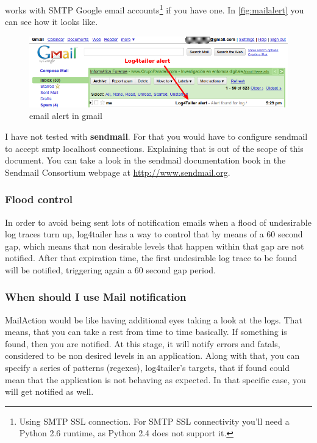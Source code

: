 \logftailer{} works with SMTP Google email accounts\footnote{Using SMTP SSL
connection. For SMTP SSL connectivity you'll need a Python 2.6 runtime, as
Python 2.4 does not support it.} if you have one.  In \autoref{fig:mailalert}
you can see how it looks like.

\begin{figure}[hb]
\includegraphics[scale=0.55]{emailalert.png}
\caption{\logftailer{} email alert in gmail}\label{fig:mailalert}
\end{figure}

I have not tested \logftailer{} with \textbf{sendmail}. For that you would have
to configure sendmail to accept smtp localhost connections.  Explaining that is
out of the scope of this document. You can take a look in the sendmail
documentation book in the Sendmail Consortium webpage at
\href{http://www.sendmail.org}{http://www.sendmail.org}.

\subsubsection{Flood control}
In order to avoid being sent lots of notification emails when a flood of
undesirable log traces turn up, log4tailer has a way to control that by means
of a 60 second gap, which means that non desirable levels that happen within
that gap are not notified. After that expiration time, the first undesirable
log trace to be found will be notified, triggering again a 60 second gap
period. 
 
\subsubsection{When should I use Mail notification}

MailAction would be like having additional eyes taking a look at the logs. That
means, that you can take a rest from time to time basically. If something is
found, then you are notified. At this stage, it will notify errors and fatals,
considered to be non desired levels in an application. Along with that, you can
specify a series of patterns (regexes), log4tailer's targets, that if found
could mean that the application is not behaving as expected. In that specific
case, you will get notified as well.
  
